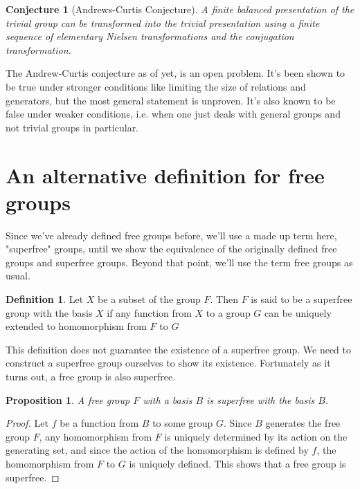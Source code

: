 \documentclass[12pt]{article}
\newtheorem{prop}[thm]{Proposition}
\newtheorem{conj}[thm]{Conjecture}
\theoremstyle{definition}
\newtheorem{defn}{Definition}[section]
\begin{document}
\begin{conj}[Andrews-Curtis Conjecture]
A finite balanced presentation of the trivial group can be transformed into the trivial presentation using a finite sequence of elementary Nielsen transformations and the conjugation transformation.
\end{conj}

The Andrew-Curtis conjecture as of yet, is an open problem. It's been shown to be true under stronger conditions like limiting the size of relations and generators\cite{genetic}, but the most general statement is unproven. It's also known to be false under weaker conditions, i.e. when one just deals with general groups and not trivial groups in particular.

\section{An alternative definition for free groups}

Since we've already defined free groups before, we'll use a made up term here, "superfree" groups, until we show the equivalence of the originally defined free groups and superfree groups. Beyond that point, we'll use the term free groups as usual.

\begin{defn}\cite{lyndon}
Let $X$ be a subset of the group $F$. Then $F$ is said to be a superfree group with the basis $X$ if any function from $X$ to a group $G$ can be uniquely extended to homomorphism from $F$ to $G$
\end{defn}

This definition does not guarantee the existence of a superfree group. We need to construct a superfree group ourselves to show its existence. Fortunately as it turns out, a free group is also superfree.

\begin{prop}
A free group $F$ with a basis $B$ is superfree with the basis $B$.
\end{prop}

\begin{proof}
Let $f$ be a function from $B$ to some group $G$. Since $B$ generates the free group $F$, any homomorphism from $F$ is uniquely determined by its action on the generating set, and since the action of the homomorphism is defined by $f$, the homomorphism from $F$ to $G$ is uniquely defined. This shows that a free group is superfree.
\end{proof}
\end{document}
